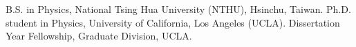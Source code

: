 %

                {B.S. in Physics, National Tsing Hua University (NTHU), Hsinchu, Taiwan.}
                {Ph.D. student in Physics, University of California, Los Angeles (UCLA).}
                {Dissertation Year Fellowship, Graduate Division, UCLA.}






\let\oldbibitem\bibitem%
\renewcommand{\bibitem}[2][]{\oldbibitem{#2}}%

